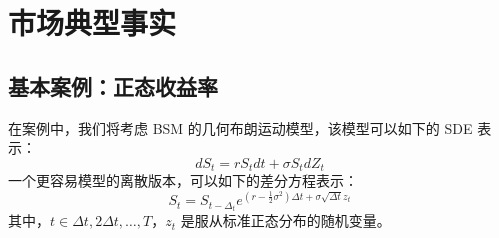 \chapter{市场典型事实\label{ch03}}
\section{基本案例：正态收益率}
在案例中，我们将考虑 BSM 的几何布朗运动模型，该模型可以如下的 SDE 表示：
\begin{equation}
    dS_t = rS_tdt + \sigma S_tdZ_t
\end{equation}
一个更容易模型的离散版本，可以如下的差分方程表示：
\begin{equation}
    S_t = S_{t-\Delta_t}e^{(r-\frac{1}{2}\sigma^2)\Delta t+\sigma \sqrt{\Delta t}z_t}
\end{equation}
其中，$t\in {\Delta t, 2\Delta t, \dots, T}$，$z_t$ 是服从标准正态分布的随机变量。
